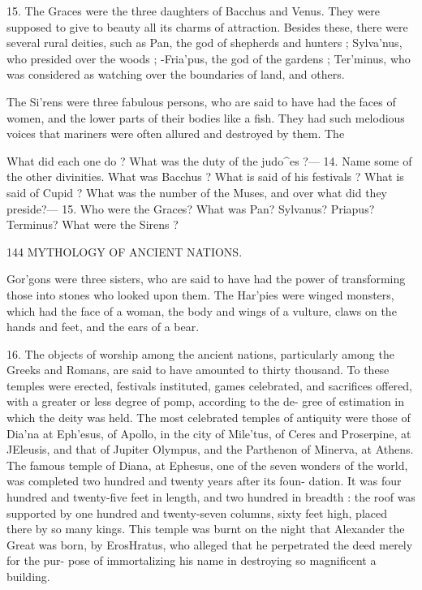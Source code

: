 \documentclass[openany,a4paper]{memoir}
\begin{document}
15. The Graces were the three daughters of Bacchus and 
Venus. They were supposed to give to beauty all its charms 
of attraction. Besides these, there were several rural deities, 
such as Pan, the god of shepherds and hunters ; Sylva'nus, 
who presided over the woods ; -Fria'pus, the god of the 
gardens ; Ter'minus, who was considered as watching over 
the boundaries of land, and others. 

The Si'rens were three fabulous persons, who are said to 
have had the faces of women, and the lower parts of their 
bodies like a fish. They had such melodious voices that 
mariners were often allured and destroyed by them. The 

What did each one do ? What was the duty of the judo^es ?— 14. Name 
some of the other divinities. What was Bacchus ? What is said of 
his festivals ? What is said of Cupid ? What was the number of the 
Muses, and over what did they preside?— 15. Who were the Graces? 
What was Pan? Sylvanus? Priapus? Terminus? What were the 
Sirens ? 



144 MYTHOLOGY OF ANCIENT NATIONS. 

Gor'gons were three sisters, who are said to have had the 
power of transforming those into stones who looked upon 
them. The Har'pies were winged monsters, which had the 
face of a woman, the body and wings of a vulture, claws on 
the hands and feet, and the ears of a bear. 

16. The objects of worship among the ancient nations, 
particularly among the Greeks and Romans, are said to have 
amounted to thirty thousand. To these temples were erected, 
festivals instituted, games celebrated, and sacrifices offered, 
with a greater or less degree of pomp, according to the de- 
gree of estimation in which the deity was held. The most 
celebrated temples of antiquity were those of Dia'na at 
Eph'esus, of Apollo, in the city of Mile'tus, of Ceres and 
Proserpine, at JEleusis, and that of Jupiter Olympus, and 
the Parthenon of Minerva, at Athens. The famous temple 
of Diana, at Ephesus, one of the seven wonders of the world, 
was completed two hundred and twenty years after its foun- 
dation. It was four hundred and twenty-five feet in length, 
and two hundred in breadth : the roof was supported by one 
hundred and twenty-seven columns, sixty feet high, placed 
there by so many kings. This temple was burnt on the 
night that Alexander the Great was born, by ErosHratus, 
who alleged that he perpetrated the deed merely for the pur- 
pose of immortalizing his name in destroying so magnificent 
a building. 
\end{document}
